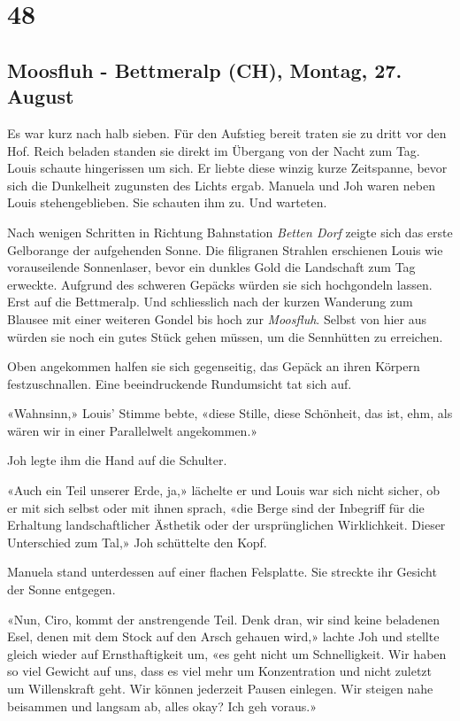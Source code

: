 \chapter{48}

\section{Moosfluh - Bettmeralp (CH), Montag, 27. August}



Es war kurz nach halb sieben.
Für den Aufstieg bereit traten sie zu dritt vor den Hof. Reich beladen
standen sie direkt im Übergang von der Nacht zum Tag. Louis schaute
hingerissen um sich. Er liebte diese winzig kurze Zeitspanne, bevor sich
die Dunkelheit zugunsten des Lichts ergab. Manuela und Joh waren neben
Louis stehengeblieben. Sie schauten ihm zu. Und warteten.

Nach wenigen Schritten in Richtung Bahnstation \emph{Betten
Dorf} zeigte sich das erste Gelborange der aufgehenden Sonne. Die
filigranen Strahlen erschienen Louis wie vorauseilende Sonnenlaser,
bevor ein dunkles Gold die Landschaft zum Tag erweckte.
Aufgrund des schweren Gepäcks würden sie sich hochgondeln lassen. Erst auf die Bettmeralp. Und schliesslich nach der kurzen Wanderung zum Blausee mit einer weiteren Gondel bis hoch zur \emph{Moosfluh}. Selbst von hier aus würden sie
noch ein gutes Stück gehen müssen, um die Sennhütten zu erreichen.

Oben angekommen halfen sie sich gegenseitig, 
das Gepäck an ihren Körpern festzuschnallen. Eine beeindruckende
Rundumsicht tat sich auf.

«Wahnsinn,» Louis’ Stimme bebte, «diese Stille, diese Schönheit, das
ist, ehm, als wären wir in einer Parallelwelt angekommen.»

Joh legte ihm die Hand auf die Schulter.

«Auch ein Teil unserer Erde, ja,» lächelte er und Louis war sich nicht
sicher, ob er mit sich selbst oder mit ihnen sprach, «die Berge sind der
Inbegriff für die Erhaltung landschaftlicher Ästhetik oder der
ursprünglichen Wirklichkeit. Dieser Unterschied zum Tal,» Joh schüttelte
den Kopf.

Manuela stand unterdessen auf einer flachen Felsplatte. Sie streckte ihr
Gesicht der Sonne entgegen.

«Nun, Ciro, kommt der anstrengende Teil. Denk dran, wir sind keine
beladenen Esel, denen mit dem Stock auf den Arsch gehauen wird,» lachte
Joh und stellte gleich wieder auf Ernsthaftigkeit um, «es geht nicht um Schnelligkeit. Wir haben so viel Gewicht auf uns, dass es viel mehr um
Konzentration und nicht zuletzt um Willenskraft geht. Wir können
jederzeit Pausen einlegen. Wir steigen nahe beisammen und langsam ab,
alles okay? Ich geh voraus.»

